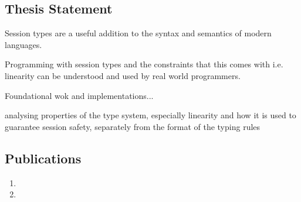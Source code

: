 


\subsection{Thesis Statement}
Session types are a useful addition to the syntax and semantics of modern languages.

Programming with session types and the constraints that this comes with i.e. linearity can be understood and used by real world programmers.

Foundational wok and implementations...


analysing properties of the type system, especially linearity and how it is used to guarantee session safety, separately from the format of the typing rules
%

\subsection{Publications}
\begin{enumerate}
   \item {}
   \item {}
 \end{enumerate}
